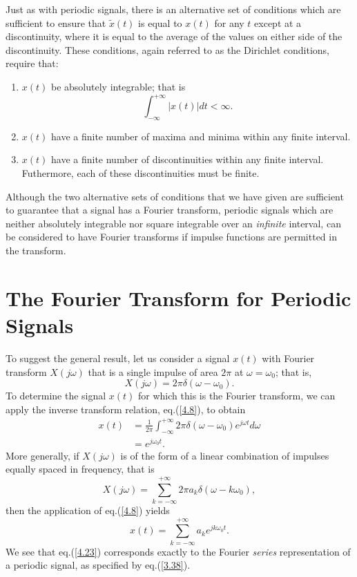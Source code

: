 \documentclass[a4paper,10pt,twoside]{book}
\begin{document}
Just as with periodic signals, there is an alternative set of conditions which are sufficient to ensure that $\tilde{x}(t)$ is equal to $x(t)$ for any $t$ except at a discontinuity, where it is equal to the average of the values on either side of the discontinuity. These conditions, again referred to as the Dirichlet conditions, require that:
\begin{enumerate}
    \item $x(t)$ be absolutely integrable; that is
    \begin{equation}
        \int_{-\infty}^{+\infty}|x(t)|dt<\infty.
        \label{4.13}
    \end{equation}
    \item $x(t)$ have a finite number of maxima and minima within any finite interval.
    \item $x(t)$ have a finite number of discontinuities within any finite interval. Futhermore, each of these discontinuities must be finite.
\end{enumerate}

Although the two alternative sets of conditions that we have given are sufficient to guarantee that a signal has a Fourier transform, periodic signals which are neither absolutely integrable nor square integrable over an \textit{infinite} interval, can be considered to have Fourier transforms if impulse functions are permitted in the transform.

\section{The Fourier Transform for Periodic Signals}

To suggest the general result, let us consider a signal $x(t)$ with Fourier transform $X(j\omega)$ that is a single impulse of area $2\pi$ at $\omega=\omega_0$; that is,
\begin{equation}
    X(j\omega)=2\pi\delta(\omega-\omega_0).
    \label{4.21}
\end{equation}
To determine the signal $x(t)$ for which this is the Fourier transform, we can apply the inverse transform relation, eq.\;(\ref{4.8}), to obtain
\begin{equation*}
    \begin{aligned}x(t)&= \frac{1}{2\pi}\int_{-\infty}^{+\infty}2\pi\delta(\omega-\omega_{0})e^{j\omega t} d\omega\\&= e^{j\omega_0t}.\end{aligned}
\end{equation*}
More generally, if $X(j\omega)$ is of the form of a linear combination of impulses equally spaced in frequency, that is
\begin{equation}
    X(j\omega)=\sum_{k=-\infty}^{+\infty}2\pi a_k\delta(\omega-k\omega_0),
    \label{4.22}
\end{equation}
then the application of eq.\;(\ref{4.8}) yields
\begin{equation}
    x(t)=\sum_{k=-\infty}^{+\infty}a_ke^{jk\omega_0t}.
    \label{4.23}
\end{equation}
We see that eq.\;(\ref{4.23}) corresponds exactly to the Fourier \textit{series} representation of a periodic signal, as specified by eq.\;(\ref{3.38}).
\end{document}
